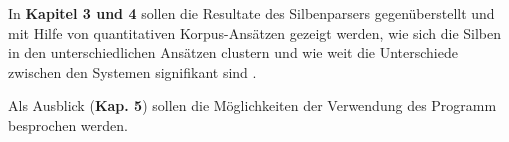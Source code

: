 \documentclass[a4paper]{scrartcl}
\begin{document}
In \textbf{Kapitel 3 und 4} sollen die Resultate des Silbenparsers gegenüberstellt und mit Hilfe von quantitativen Korpus-Ansätzen gezeigt werden, wie sich die Silben in den unterschiedlichen Ansätzen clustern \cite{lebart1998} und wie weit die Unterschiede zwischen den Systemen signifikant sind \cite{baayen2001}.
 
Als Ausblick (\textbf{Kap. 5}) sollen die Möglichkeiten der Verwendung des Programm besprochen werden. 
    


\end{document}
